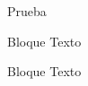 \begin{frame}{Prueba}
  \begin{block}{Bloque}
    Texto
  \end{block}
\end{frame}
\begin{frame}{}
  \begin{block}{Bloque}
    Texto
  \end{block}
\end{frame}


